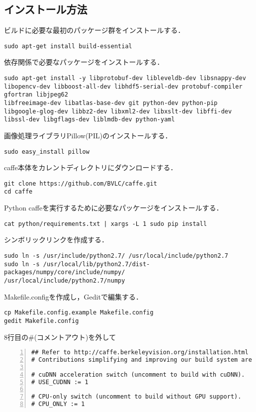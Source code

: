 \documentclass[a4paper,10pt]{jsarticle}
\begin{document}
\subsection{インストール方法}
ビルドに必要な最初のパッケージ群をインストールする．
\begin{lstlisting}[basicstyle=\ttfamily\footnotesize, frame=single]
sudo apt-get install build-essential
\end{lstlisting}
依存関係で必要なパッケージをインストールする．
\begin{lstlisting}[basicstyle=\ttfamily\footnotesize, frame=single]
sudo apt-get install -y libprotobuf-dev libleveldb-dev libsnappy-dev
libopencv-dev libboost-all-dev libhdf5-serial-dev protobuf-compiler gfortran libjpeg62
libfreeimage-dev libatlas-base-dev git python-dev python-pip
libgoogle-glog-dev libbz2-dev libxml2-dev libxslt-dev libffi-dev
libssl-dev libgflags-dev liblmdb-dev python-yaml
\end{lstlisting}
画像処理ライブラリPillow(PIL)のインストールする．
\begin{lstlisting}[basicstyle=\ttfamily\footnotesize, frame=single]
sudo easy_install pillow
\end{lstlisting}
caffe本体をカレントディレクトリにダウンロードする．
\begin{lstlisting}[basicstyle=\ttfamily\footnotesize, frame=single]
git clone https://github.com/BVLC/caffe.git
cd caffe
\end{lstlisting}
Python caffeを実行するために必要なパッケージをインストールする．
\begin{lstlisting}[basicstyle=\ttfamily\footnotesize, frame=single]
cat python/requirements.txt | xargs -L 1 sudo pip install
\end{lstlisting}
シンボリックリンクを作成する．
\begin{lstlisting}[basicstyle=\ttfamily\footnotesize, frame=single]
sudo ln -s /usr/include/python2.7/ /usr/local/include/python2.7
sudo ln -s /usr/local/lib/python2.7/dist-packages/numpy/core/include/numpy/
/usr/local/include/python2.7/numpy
\end{lstlisting}
Makefile.configを作成し，Geditで編集する．
\begin{lstlisting}[basicstyle=\ttfamily\footnotesize, frame=single]
cp Makefile.config.example Makefile.config
gedit Makefile.config
\end{lstlisting}
8行目の\#(コメントアウト)を外して
\begin{lstlisting}[basicstyle=\ttfamily\footnotesize, frame=single, numbers=left]
## Refer to http://caffe.berkeleyvision.org/installation.html
# Contributions simplifying and improving our build system are welcome!

# cuDNN acceleration switch (uncomment to build with cuDNN).
# USE_CUDNN := 1

# CPU-only switch (uncomment to build without GPU support).
# CPU_ONLY := 1
\end{lstlisting}
\end{document}

